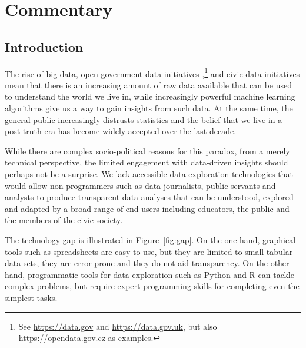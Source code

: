 \documentclass[fleqn,11pt]{report}
\theoremstyle{definition}
\begin{document}
\tableofcontents

\part{Commentary}


\chapter{Introduction}

The rise of big data, open government data initiatives \citep{attard-2015-opengov},\footnote{See
\url{https://data.gov} and \url{https://data.gov.uk}, but also \url{https://opendata.gov.cz} as
examples.} and civic data initiatives mean that there is an increasing amount of raw data available
that can be used to understand the world we live in, while increasingly powerful machine learning
algorithms give us a way to gain insights from such data. At the same time, the general
public increasingly distrusts statistics \citep{davies-2017-statistics} and the belief that we
live in a post-truth era has become widely accepted over the last decade.

While there are complex socio-political reasons for this paradox, from a merely technical
perspective, the limited engagement with data-driven insights should perhaps
not be a surprise. We lack accessible data exploration technologies that would allow
non-programmers such as data journalists, public servants and analysts to produce transparent data
analyses that can be understood, explored and adapted by a broad range of end-users including
educators, the public and the members of the civic society.

The technology gap is illustrated in Figure~\ref{fig:gap}. On the one hand, graphical tools such as
spreadsheets are easy to use, but they are limited to small tabular data sets, they are error-prone
\citep{panko-2015-errors} and they do not aid transparency. On the other hand, programmatic tools for
data exploration such as Python and R can tackle complex problems, but require expert programming
skills for completing even the simplest tasks.
\end{document}
